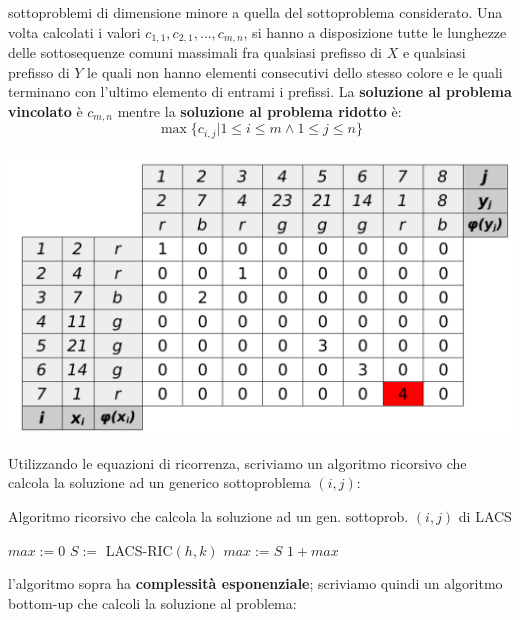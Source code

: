 \documentclass[12pt]{article}
\begin{document}
sottoproblemi di dimensione minore a quella del sottoproblema considerato. \newline
Una volta calcolati i valori $c_{1,1}, c_{2,1}, \dots, c_{m,n}$, si hanno a disposizione tutte le lunghezze delle sottosequenze comuni massimali fra qualsiasi prefisso di $X$ e qualsiasi prefisso di $Y$ le quali non hanno elementi consecutivi dello stesso colore e le quali terminano con l'ultimo elemento di entrami i prefissi.
La \textbf{soluzione al problema vincolato} è $c_{m,n}$ mentre la \textbf{soluzione al problema ridotto} è:
$$\max\{c_{i,j}|1 \leq i \leq m \land 1 \leq j \leq n\}$$
\begin{center}
    \includegraphics[width = 0.60\linewidth]{Images/13.png}
\end{center}
Utilizzando le equazioni di ricorrenza, scriviamo un algoritmo ricorsivo che calcola la soluzione ad un generico sottoproblema $(i,j)$: \newline
\begin{algorithm}[H]
    \caption{Algoritmo ricorsivo che calcola la soluzione ad un gen. sottoprob. $(i,j)$ di LACS}
    \DontPrintSemicolon
     {
         {
        } {
            $max := 0$ \;
             {
                 {
                     {
                        $S :=$ LACS-RIC$(h,k)$ \;
                         {
                            $max := S$
                        }
                    }
                }
            }
        }
        \Return $1 + max$
    }
\end{algorithm} \noindent
l'algoritmo sopra ha \textbf{complessità esponenziale}; scriviamo quindi un algoritmo bottom-up che calcoli la soluzione al problema: \newline
\end{document}
